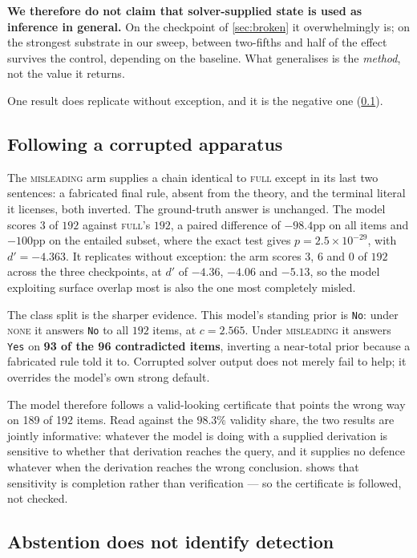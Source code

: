 \documentclass[10pt,twocolumn]{article}
\begin{document}
\textbf{We therefore do not claim that solver-supplied state is used as inference
in general.} On the checkpoint of \cref{sec:broken} it overwhelmingly is; on the
strongest substrate in our sweep, between two-fifths and half of the effect survives the control, depending on the baseline. What generalises is the \emph{method}, not the value it returns.

One result does replicate without exception, and it is the negative one
(\cref{sec:corruption}).

\subsection{Following a corrupted apparatus}
\label{sec:corruption}

The \textsc{misleading} arm supplies a chain identical to \textsc{full} except in
its last two sentences: a fabricated final rule, absent from the theory, and the
terminal literal it licenses, both inverted. The ground-truth answer is unchanged. The model scores $3$ of $192$ against \textsc{full}'s $192$, a paired difference
of $-98.4$pp on all items and $-100$pp on the entailed subset, where the exact
test gives $p = 2.5\times10^{-29}$, with $d' = -4.363$. It replicates without exception: the arm scores $3$, $6$ and
$0$ of $192$ across the three checkpoints, at $d'$ of $-4.36$, $-4.06$ and
$-5.13$, so the model exploiting surface overlap most is also the one most
completely misled.

The class split is the sharper evidence. This model's standing prior is \texttt{No}: under \textsc{none} it answers
\texttt{No} to all $192$ items, at $c = 2.565$. Under
\textsc{misleading} it answers \texttt{Yes} on \textbf{93 of the 96 contradicted
items}, inverting a near-total prior because a fabricated rule told it to.
Corrupted solver output does not merely fail to help; it overrides the model's
own strong default.

The model therefore follows a valid-looking certificate that points the wrong
way on 189 of 192 items. Read against the $98.3\%$ validity share, the two
results are jointly informative: whatever the model is doing with a supplied
derivation is sensitive to whether that derivation reaches the query, and it
supplies no defence whatever when the derivation reaches the wrong conclusion.
 shows that sensitivity is completion rather than
verification --- so the certificate is followed, not checked.

\subsection{Abstention does not identify detection}
\label{sec:detection}
\end{document}
